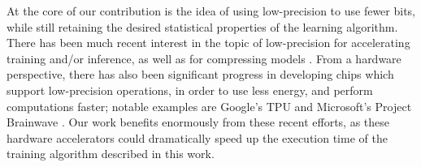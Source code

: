 At the core of our contribution is the idea of using low-precision to use fewer bits, while still retaining the desired statistical properties of the learning algorithm.  There has been much recent interest in the topic of low-precision for accelerating training and/or inference, as well as for compressing models \citep{gupta15,hogwild15,hubara16,halp18,desa17,han15}.  From a hardware perspective, there has also been significant progress in developing chips which support low-precision operations, in order to use less energy, and perform computations faster; notable examples are Google's TPU \citep{tpu17} and Microsoft's Project Brainwave \citep{brainwave17}. Our work benefits enormously from these recent efforts, as these hardware accelerators could dramatically speed up the execution time of the training algorithm described in this work.

